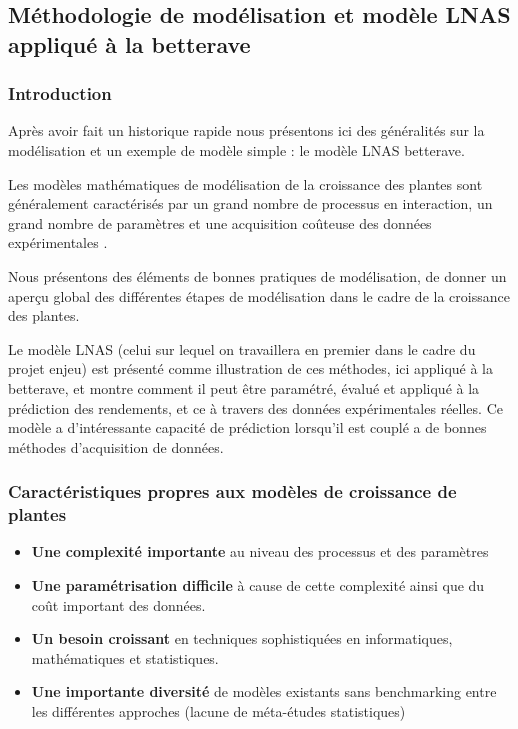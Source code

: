 \subsection{Méthodologie de modélisation et modèle LNAS appliqué à la betterave}

\subsubsection{Introduction}

Après avoir fait un historique rapide nous présentons ici des généralités sur la modélisation et un exemple de modèle simple : le modèle LNAS betterave.

Les modèles mathématiques de modélisation de la croissance des plantes sont généralement caractérisés par un grand nombre de processus en interaction,  un grand nombre de paramètres et une acquisition coûteuse des données expérimentales \cite{article_intro_generale}.

Nous présentons des éléments de bonnes pratiques de modélisation, de donner un aperçu global des différentes étapes de modélisation dans le cadre de la croissance des plantes.

Le modèle LNAS (celui sur lequel on travaillera en premier dans le cadre du projet enjeu) est présenté comme illustration de ces méthodes, ici appliqué à la betterave, et montre comment il peut être paramétré, évalué et appliqué à la prédiction des rendements, et ce à travers des données expérimentales réelles. Ce modèle a d’intéressante capacité de prédiction lorsqu’il est couplé a de bonnes méthodes d’acquisition de données.

\subsubsection{Caractéristiques propres aux modèles de croissance de plantes}

\begin{itemize}

\item \textbf{Une complexité importante} au niveau des processus et des paramètres
\item \textbf{Une paramétrisation difficile} à cause de cette complexité ainsi que du coût important des données.
\item \textbf{Un besoin croissant} en techniques sophistiquées en informatiques, mathématiques et statistiques.
\item \textbf{Une importante diversité} de modèles existants sans benchmarking entre les différentes approches (lacune de méta-études statistiques)

\end{itemize}


